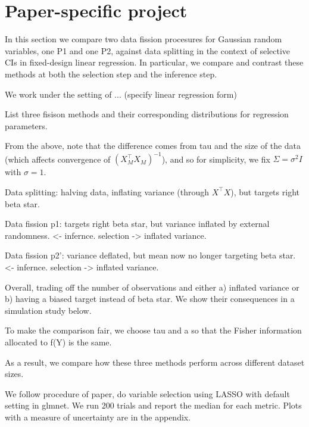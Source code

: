 \section{Paper-specific project}\label{sec:project}

In this section we compare two data fission procesures for Gaussian random variables, one P1 and one P2, against data splitting in the context of selective CIs in fixed-design linear regression. In particular, we compare and contrast these methods at both the selection step and the inference step.

We work under the setting of ... (specify linear regression form)

List three fisison methods and their corresponding distributions for regression parameters.

From the above, note that the difference comes from tau and the size of the data (which affects convergence of $(X_M^\top X_M)^{-1}$), and so for simplicity, we fix $\Sigma = \sigma^2I$ with $\sigma=1$.

Data splitting: halving data, inflating variance (through $X^\top X$), but targets right beta star.

Data fission p1: targets right beta star, but variance inflated by external randomness. <- infernce. selection -> inflated variance.

Data fission p2': variance deflated, but mean now no longer targeting beta star. <- infernce. selection -> inflated variance.

Overall, trading off the number of observations and either a) inflated variance or b) having a biased target instead of beta star. We show their consequences in a simulation study below.

To make the comparison fair, we choose tau and a so that the Fisher information allocated to f(Y) is the same.

As a result, we compare how these three methods perform across different dataset sizes.

We follow procedure of paper, do variable selection using LASSO with default setting in glmnet. We run 200 trials and report the median for each metric. Plots with a measure of uncertainty are in the appendix.

